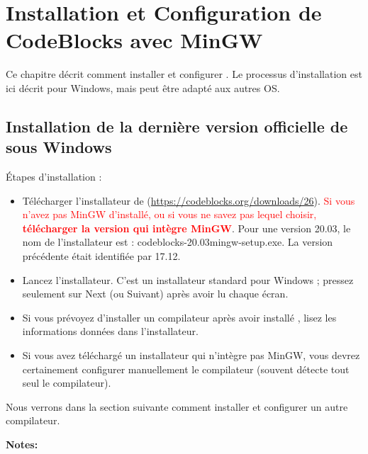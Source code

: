 ﻿\chapter{Installation et Configuration de CodeBlocks avec MinGW}\label{sec:install_codeblocks}

Ce chapitre décrit comment installer et configurer \codeblocks. Le processus d'installation est ici décrit pour Windows, mais peut être adapté aux autres OS.

\section{Installation de la dernière version officielle de \codeblocks sous Windows}

Étapes d'installation :
\begin{itemize}
\item Télécharger l'installateur de \codeblocks (\url{https://codeblocks.org/downloads/26}). \textcolor{red}{Si vous n'avez pas MinGW d'installé, ou si vous ne savez pas lequel choisir, \textbf{télécharger la version qui intègre MinGW}}. Pour une version 20.03, le nom de l'installateur est : codeblocks-20.03mingw-setup.exe. La version précédente était identifiée par 17.12.
\item Lancez l'installateur. C'est un installateur standard pour Windows ; pressez seulement sur Next (ou Suivant) après avoir lu chaque écran.
\item Si vous prévoyez d'installer un compilateur après avoir installé \codeblocks, lisez les informations données dans l'installateur.
\item Si vous avez téléchargé un installateur qui n'intègre pas MinGW, vous devrez certainement configurer manuellement le compilateur (souvent \codeblocks détecte tout seul le compilateur).
\end{itemize}

Nous verrons dans la section suivante comment installer et configurer un autre compilateur.

\textbf{Notes:}

